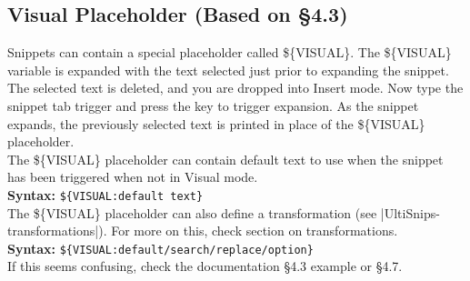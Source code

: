\documentclass[11pt]{article}
\theoremstyle{plain}%
\theoremstyle{definition}
\theoremstyle{remark}
\begin{document}
		 \subsection{Visual Placeholder (Based on \S4.3)}
	Snippets can contain a special placeholder called \$\{VISUAL\}. The \$\{VISUAL\} variable is expanded with the text selected just prior to expanding the snippet.\\
	The selected text is deleted, and you are dropped into Insert mode. Now type the snippet tab trigger and press the key to trigger expansion. As the snippet expands, the previously selected text is printed in place of the \$\{VISUAL\} placeholder. \\
	The \$\{VISUAL\} placeholder can contain default text to use when the snippet has been triggered when not in Visual mode.\\
	\textbf{Syntax:} \texttt{\$\{VISUAL:default text\}}\\
	The \$\{VISUAL\} placeholder can also define a transformation (see |UltiSnips-transformations|). For more on this, check section on transformations. \\
	\textbf{Syntax:} \texttt{\$\{VISUAL:default/search/replace/option\}} \\
	If this seems confusing, check the documentation \S4.3 example or \S4.7.
\end{document}
